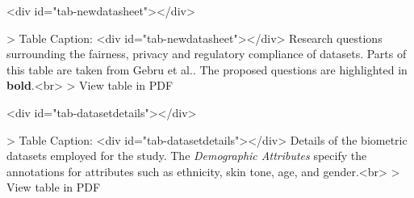 \documentclass[journal]{IEEEtran}
\begin{document}
\begin{table}<div id="tab-newdatasheet"></div>

> Table Caption: <div id="tab-newdatasheet"></div>
 Research questions surrounding the fairness, privacy and regulatory compliance of datasets. Parts of this table are taken from Gebru et al.\cite{gebru2021datasheets}. The proposed questions are highlighted in \textbf{bold}.<br>
> View table in PDF
\end{table}

\begin{table}<div id="tab-datasetdetails"></div>

> Table Caption: <div id="tab-datasetdetails"></div>
Details of the biometric datasets employed for the study. The \textit{Demographic Attributes} specify the annotations for attributes such as ethnicity, skin tone, age, and gender.<br>
> View table in PDF
\end{table}
\end{document}
